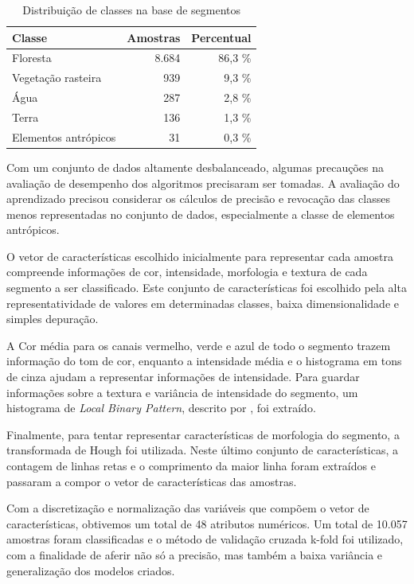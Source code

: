 \begin{table}[h]
\centering
\begin{tabulary}{\linewidth}{|L|R|R|}
\hline
\textbf{Classe} & \textbf{Amostras} & \textbf{Percentual} \\ \hline
Floresta             & 8.684 & 86,3 \% \\ \hline
Vegetação rasteira   &   939 &  9,3 \% \\ \hline
Água                 &   287 &  2,8 \% \\ \hline
Terra                &   136 &  1,3 \% \\ \hline
Elementos antrópicos &    31 &  0,3 \% \\ \hline
\end{tabulary}
\caption{Distribuição de classes na base de segmentos}
\label{tab:experimentoRegioesDistribuicao}
\end{table}

Com um conjunto de dados altamente desbalanceado, algumas precauções na avaliação de desempenho dos algoritmos precisaram ser tomadas. A avaliação do aprendizado precisou considerar os cálculos de precisão e revocação das classes menos representadas no conjunto de dados, especialmente a classe de elementos antrópicos.

O vetor de características escolhido inicialmente para representar cada amostra compreende informações de cor, intensidade, morfologia e textura de cada segmento a ser classificado. Este conjunto de características foi escolhido pela alta representatividade de valores em determinadas classes, baixa dimensionalidade e simples depuração.

A Cor média para os canais vermelho, verde e azul de todo o segmento trazem informação do tom de cor, enquanto a intensidade média e o histograma em tons de cinza ajudam a representar informações de intensidade. Para guardar informações sobre a textura e variância de intensidade do segmento, um histograma de \textit{Local Binary Pattern}, descrito por , foi extraído.

Finalmente, para tentar representar características de morfologia do segmento, a transformada de Hough foi utilizada. Neste último conjunto de características, a contagem de linhas retas e o comprimento da maior linha foram extraídos e passaram a compor o vetor de características das amostras.

Com a discretização e normalização das variáveis que compõem o vetor de características, obtivemos um total de 48 atributos numéricos. Um total de 10.057 amostras foram classificadas e o método de validação cruzada k-fold foi utilizado, com a finalidade de aferir não só a precisão, mas também a baixa variância e generalização dos modelos criados.

